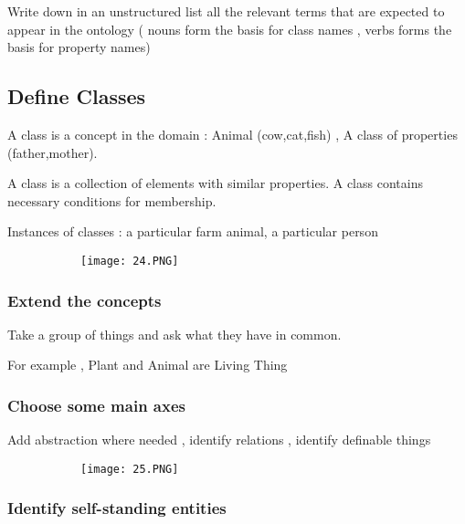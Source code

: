 \documentclass{article}
\begin{document}
Write down in an unstructured list all the relevant terms that are expected to appear in the ontology ( nouns form the basis for class names , verbs forms the basis for property names)

\subsection{Define Classes}

A class is a concept in the domain : Animal (cow,cat,fish) , A class of properties (father,mother).

A class is a collection of elements with similar properties. A class contains necessary conditions for membership.

Instances of classes : a particular farm animal, a particular person


\begin{figure}[ht!]
  \centering
  \begin{subfigure}[b]{0.7\linewidth}
    \texttt{[image: 24.PNG]}
  \end{subfigure}
\end{figure}

\subsubsection{Extend the concepts}

Take a group of things and ask what they have in common.

For example , Plant and Animal are Living Thing

\subsubsection{Choose some main axes}

Add abstraction where needed , identify relations , identify definable things


\begin{figure}[ht!]
  \centering
  \begin{subfigure}[b]{0.7\linewidth}
    \texttt{[image: 25.PNG]}
  \end{subfigure}
\end{figure}

\subsubsection{Identify self-standing entities}
\end{document}
